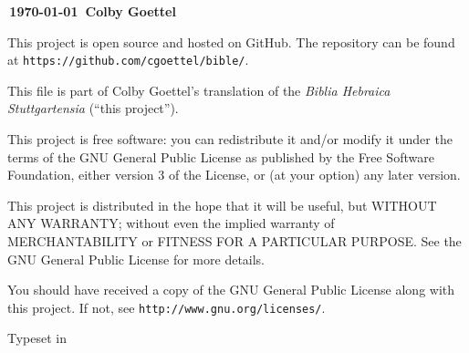 \vfill

\begin{center}
    \textbf{\textcopyleft\,\justtheyear\today\ Colby Goettel}
\end{center}

\vfill

This project is open source and hosted on GitHub. The repository can be found at \texttt{https://github.com/cgoettel/bible/}.

\vfill

This file is part of Colby Goettel's translation of the \emph{Biblia Hebraica Stuttgartensia} (``this project'').

This project is free software: you can redistribute it and/or modify it under the terms of the GNU General Public License as published by the Free Software Foundation, either version 3 of the License, or (at your option) any later version.

This project is distributed in the hope that it will be useful, but WITHOUT ANY WARRANTY; without even the implied warranty of MERCHANTABILITY or FITNESS FOR A PARTICULAR PURPOSE.  See the GNU General Public License for more details.

You should have received a copy of the GNU General Public License along with this project. If not, see \texttt{http://www.gnu.org/licenses/}.

\vfill

\begin{center}
    Typeset in \XeTeX
\end{center}
